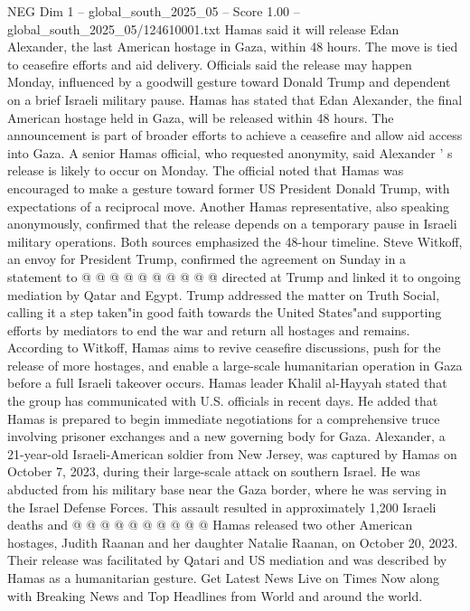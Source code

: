 \begin{textsample}{NEG Dim 1 – global\_south\_2025\_05 – Score 1.00 – global\_south\_2025\_05/124610001.txt}  \label{ex:f1_neg_176}
Hamas said it will release Edan Alexander, the last American hostage in Gaza, within 48 hours.
The move is tied to ceasefire efforts and aid delivery.
Officials said the release may happen Monday, influenced by a goodwill gesture toward Donald Trump and dependent on a brief Israeli military pause.
Hamas has stated that Edan Alexander, the final American hostage held in Gaza, will be released within 48 hours.
The announcement is part of broader efforts to achieve a ceasefire and allow aid access into Gaza.
A senior Hamas official, who requested anonymity, said Alexander ' s release is likely to occur on Monday.
The official noted that Hamas was encouraged to make a gesture toward former US President Donald Trump, with expectations of a reciprocal move.
Another Hamas representative, also speaking anonymously, confirmed that the release depends on a temporary pause in Israeli military operations.
Both sources emphasized the 48-hour timeline.
Steve Witkoff, an envoy for President Trump, confirmed the agreement on Sunday in a statement to @ @ @ @ @ @ @ @ @ @ directed at Trump and linked it to ongoing mediation by Qatar and Egypt.
Trump addressed the matter on Truth Social, calling it a step taken"in good faith towards the United States"and supporting efforts by mediators to end the war and return all hostages and remains.
According to Witkoff, Hamas aims to revive ceasefire discussions, push for the release of more hostages, and enable a large-scale humanitarian operation in Gaza before a full Israeli takeover occurs.
Hamas leader Khalil al-Hayyah stated that the group has communicated with U.S. officials in recent days.
He added that Hamas is prepared to begin immediate negotiations for a comprehensive truce involving prisoner exchanges and a new governing body for Gaza.
Alexander, a 21-year-old Israeli-American soldier from New Jersey, was captured by Hamas on October 7, 2023, during their large-scale attack on southern Israel.
He was abducted from his military base near the Gaza border, where he was serving in the Israel Defense Forces.
This assault resulted in approximately 1,200 Israeli deaths and @ @ @ @ @ @ @ @ @ @ Hamas released two other American hostages, Judith Raanan and her daughter Natalie Raanan, on October 20, 2023.
Their release was facilitated by Qatari and US mediation and was described by Hamas as a humanitarian gesture.
Get Latest News Live on Times Now along with Breaking News and Top Headlines from World and around the world.

\end{textsample}
